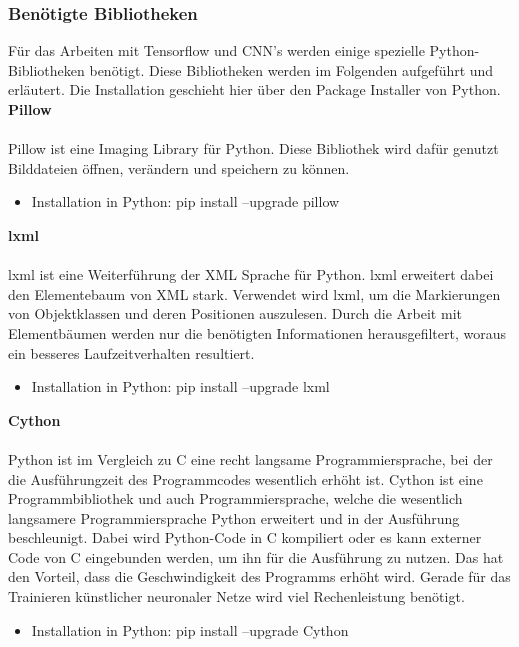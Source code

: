 \documentclass[a4paper,12pt,oneside]{article}
\begin{document}
\subsubsection{Benötigte Bibliotheken}
Für das Arbeiten mit Tensorflow und CNN's werden einige spezielle Python-Bibliotheken benötigt. Diese Bibliotheken werden im Folgenden aufgeführt und erläutert. Die Installation geschieht hier über den \glqq Package Installer\grqq{} von Python.
\\
 
\textbf{Pillow}\\\\
Pillow ist eine \glqq Imaging Library \grqq{} für Python. Diese Bibliothek wird dafür genutzt Bilddateien öffnen, verändern und speichern zu können.

  \begin{itemize}
\item Installation in Python: pip install --upgrade pillow
  \end{itemize}

\textbf{lxml}\\\\ 
lxml ist eine Weiterführung der XML Sprache für Python. lxml erweitert dabei den Elementebaum von XML stark. Verwendet wird lxml, um die Markierungen von Objektklassen und deren Positionen auszulesen. Durch die Arbeit mit Elementbäumen werden nur die benötigten Informationen herausgefiltert, woraus ein besseres Laufzeitverhalten resultiert.
  
  \begin{itemize}
\item Installation in Python: pip install --upgrade lxml
  \end{itemize}
  
  
\textbf{Cython}\\\\
Python ist im Vergleich zu C eine recht langsame Programmiersprache, bei der die Ausführungzeit des Programmcodes wesentlich erhöht ist. Cython ist eine Programmbibliothek und auch Programmiersprache, welche die wesentlich langsamere Programmiersprache Python erweitert und in der Ausführung beschleunigt. Dabei wird Python-Code in C kompiliert oder es kann externer Code von C eingebunden werden, um ihn für die Ausführung zu nutzen. Das hat den Vorteil, dass die Geschwindigkeit des Programms erhöht wird. Gerade für das Trainieren künstlicher neuronaler Netze wird viel Rechenleistung benötigt.

  \begin{itemize}
\item Installation in Python: pip install --upgrade Cython
  \end{itemize}
\end{document}
